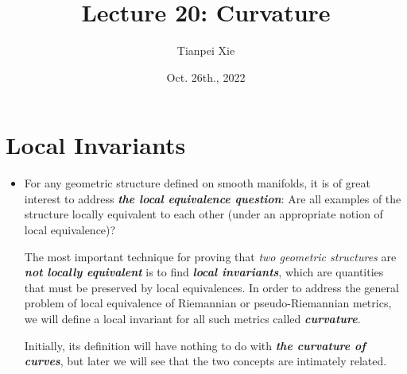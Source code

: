 \documentclass[11pt]{article}
\begin{document}
\title{Lecture 20: Curvature}
\author{ Tianpei Xie}
\date{Oct. 26th., 2022}
\maketitle
\tableofcontents
\newpage
\section{Local Invariants}
\begin{itemize}
\item \begin{remark}
For any geometric structure defined on smooth manifolds, it is of great interest to address \emph{\textbf{the local equivalence question}}: Are all examples of the structure locally equivalent to each other (under an appropriate notion of local equivalence)? 

The most important technique for proving that \emph{two geometric structures} are \emph{\textbf{not locally equivalent}} is to find \emph{\textbf{local invariants}}, which are quantities that must be preserved by local equivalences. In order to address the general problem of local equivalence of Riemannian or pseudo-Riemannian metrics, we will define a local invariant for all such metrics called \emph{\textbf{curvature}}. 

Initially, its definition will have nothing to do with \emph{\textbf{the curvature of curves}}, but later we will see that the two concepts are intimately related.
\end{remark} 



\end{itemize}
\end{document}
